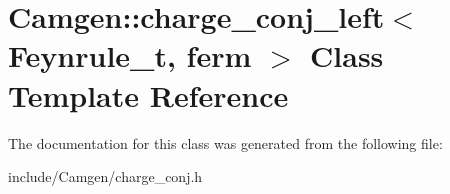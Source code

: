 \hypertarget{a00068}{\section{Camgen\-:\-:charge\-\_\-conj\-\_\-left$<$ Feynrule\-\_\-t, ferm $>$ Class Template Reference}
\label{a00068}
}


The documentation for this class was generated from the following file\-:\begin{DoxyCompactItemize}
\item 
include/\-Camgen/charge\-\_\-conj.\-h\end{DoxyCompactItemize}
